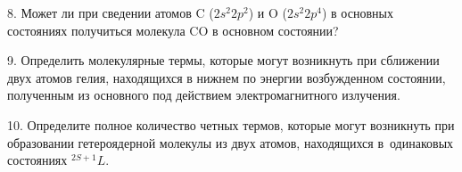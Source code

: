 \par
8. Может ли при сведении атомов $\text{C}$ ($2s^2 2p^2$) и $\text{O}$ ($2s^2 2p^4$) в основных состояниях получиться молекула $\text{CO}$ в основном состоянии?
\par
9. Определить молекулярные термы, которые могут возникнуть при сближении двух атомов гелия, находящихся в нижнем по энергии возбужденном состоянии, полученным из основного под действием электромагнитного излучения.
\par
10. Определите полное количество четных термов, которые могут возникнуть при образовании гетероядерной молекулы из двух атомов, находящихся в~одинаковых состояниях $^{2S + 1}L$.
\par